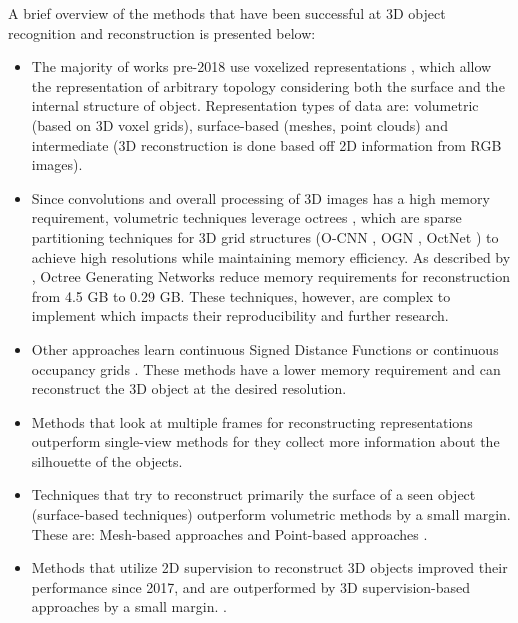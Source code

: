 A brief overview of the methods that have been successful at 3D object recognition and reconstruction is presented below:
\begin{itemize}

    \item The majority of works pre-2018 use voxelized representations \cite{yan2016perspective} \cite{choy20163d} \cite{wu2016learning}, which allow the representation of arbitrary topology considering both the surface and the internal structure of object. Representation types of data are: volumetric (based on 3D voxel grids), surface-based (meshes, point clouds) and intermediate (3D reconstruction is done based off 2D information from RGB images).
    \item Since convolutions and overall processing of 3D images has a high memory requirement, volumetric techniques leverage octrees \cite{meagher1980octree}, which are sparse partitioning techniques for 3D grid structures (O-CNN \cite{wang2017cnn}, OGN \cite{tatarchenko2017octree}, OctNet \cite{riegler2017octnet}) to achieve high resolutions while maintaining memory efficiency. As described by \textcite{tatarchenko2017octree}, Octree Generating Networks reduce memory requirements for reconstruction from 4.5 GB to 0.29 GB. These techniques, however, are complex to implement which impacts their reproducibility and further research.
    \item Other approaches learn continuous Signed Distance Functions \cite{park2019deepsdf, chen2019learning} or continuous occupancy grids \cite{mescheder2019occupancy}. These methods have a lower memory requirement and can reconstruct the 3D object at the desired resolution. 
    \item Methods that look at multiple frames for reconstructing representations outperform single-view methods for they collect more information about the silhouette of the objects. 
    \item Techniques that try to reconstruct primarily the surface of a seen object (surface-based techniques) outperform volumetric methods by a small margin. These are: Mesh-based approaches \cite{pontes2018image2mesh} and Point-based approaches \cite{kurenkov2018deformnet, fan2017point}.
    \item Methods that utilize 2D supervision to reconstruct 3D objects improved their performance since 2017, and are outperformed by 3D supervision-based approaches by a small margin. \cite{yan2016perspective, arsalan2017synthesizing}.
\end{itemize} 

